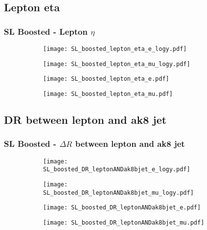 \documentclass[aspectratio=169,8pt]{beamer}
\begin{document}
\subsection{Lepton eta}
\begin{frame}
\frametitle{SL Boosted - Lepton $\eta$}
\begin{figure}
\captionsetup[subfigure]{labelformat=empty}
\begin{subfigure}{0.375\textwidth}
\texttt{[image: SL\_boosted\_lepton\_eta\_e\_logy.pdf]}
\vspace*{-0.15cm}
\end{subfigure}
\hfil
\begin{subfigure}{0.375\textwidth}
\texttt{[image: SL\_boosted\_lepton\_eta\_mu\_logy.pdf]}
\vspace*{-0.15cm}
\end{subfigure}
\hfil
\begin{subfigure}{0.375\textwidth}
\texttt{[image: SL\_boosted\_lepton\_eta\_e.pdf]}
\vspace*{-0.15cm}
\end{subfigure}
\hfil
\begin{subfigure}{0.375\textwidth}
\texttt{[image: SL\_boosted\_lepton\_eta\_mu.pdf]}
\vspace*{-0.15cm}
\end{subfigure}
\hfil
\end{figure}
\end{frame}
\newpage

\subsection{DR between lepton and ak8 jet}
\begin{frame}
\frametitle{SL Boosted - $\Delta R$ between lepton and ak8 jet}
\begin{figure}
\captionsetup[subfigure]{labelformat=empty}
\begin{subfigure}{0.375\textwidth}
\texttt{[image: SL\_boosted\_DR\_leptonANDak8bjet\_e\_logy.pdf]}
\vspace*{-0.15cm}
\end{subfigure}
\hfil
\begin{subfigure}{0.375\textwidth}
\texttt{[image: SL\_boosted\_DR\_leptonANDak8bjet\_mu\_logy.pdf]}
\vspace*{-0.15cm}
\end{subfigure}
\hfil
\begin{subfigure}{0.375\textwidth}
\texttt{[image: SL\_boosted\_DR\_leptonANDak8bjet\_e.pdf]}
\vspace*{-0.15cm}
\end{subfigure}
\hfil
\begin{subfigure}{0.375\textwidth}
\texttt{[image: SL\_boosted\_DR\_leptonANDak8bjet\_mu.pdf]}
\vspace*{-0.15cm}
\end{subfigure}
\hfil
\end{figure}
\end{frame}
\newpage
\end{document}
